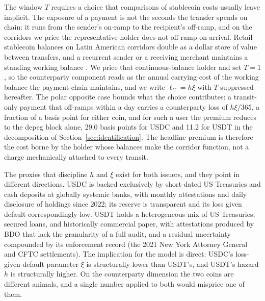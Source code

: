 The window $T$ requires a choice that comparisons of stablecoin costs usually leave implicit. The exposure of a payment is not the seconds the transfer spends on chain: it runs from the sender's on-ramp to the recipient's off-ramp, and on the corridors we price the representative holder does not off-ramp on arrival. Retail stablecoin balances on Latin American corridors double as a dollar store of value between transfers, and a recurrent sender or a receiving merchant maintains a standing working balance \citep{chainalysis_2025, aldasoro_frost_ito_2026}. We price that continuous-balance holder and set $T = 1$, so the counterparty component reads as the annual carrying cost of the working balance the payment chain maintains, and we write $\ell_C = h \xi$ with $T$ suppressed hereafter. The polar opposite case bounds what the choice contributes: a transit-only payment that off-ramps within a day carries a counterparty loss of $h\xi/365$, a fraction of a basis point for either coin, and for such a user the premium reduces to the depeg block alone, 29.0 basis points for USDC and 11.2 for USDT in the decomposition of Section~\ref{sec:identification}. The headline premium is therefore the cost borne by the holder whose balances make the corridor function, not a charge mechanically attached to every transit.

The proxies that discipline $h$ and $\xi$ exist for both issuers, and they point in different directions. USDC is backed exclusively by short-dated US Treasuries and cash deposits at globally systemic banks, with monthly attestations and daily disclosure of holdings since 2022; its reserve is transparent and its loss given default correspondingly low. USDT holds a heterogeneous mix of US Treasuries, secured loans, and historically commercial paper, with attestations produced by BDO that lack the granularity of a full audit, and a residual uncertainty compounded by its enforcement record (the 2021 New York Attorney General and CFTC settlements). The implication for the model is direct: USDC's loss-given-default parameter $\xi$ is structurally lower than USDT's, and USDT's hazard $h$ is structurally higher. On the counterparty dimension the two coins are different animals, and a single number applied to both would misprice one of them.

